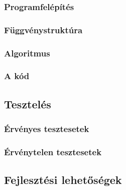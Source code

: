 \documentclass{article}
\begin{document}
      \subsubsection{Programfelépítés}
      \subsubsection{Függvénystruktúra}
      \subsubsection{Algoritmus}
      \subsubsection{A kód}
    \subsection{Tesztelés}
      \subsubsection{Érvényes tesztesetek}
      \subsubsection{Érvénytelen tesztesetek}
    \subsection{Fejlesztési lehetőségek}
\end{document}

